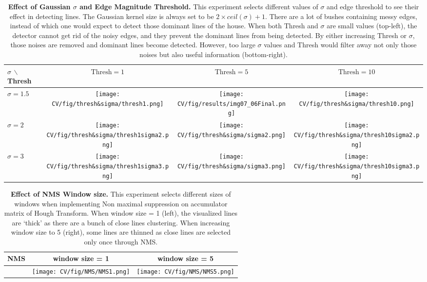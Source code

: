 \documentclass[
  course = {{16-720B Computer Vision}},
  quartile = {{1}},
  assignment = 1-Hough\ Transform,
  name = {{Kangle Deng}},
  email = {{kangled@andrew.cmu.edu}},
  firstexercise = 1
]{aga-homework}
\begin{document}
\begin{table}
  \begin{center}
    \begin{tabular}{lccc}
      \toprule
      \textbf{$\sigma$ $\backslash$ Thresh} & $\text{Thresh} = 1$ & $\text{Thresh} = 5$ & $\text{Thresh} = 10$\\
      \midrule
      $\sigma=1.5$ & \texttt{[image: CV/fig/thresh\&sigma/thresh1.png]} & \texttt{[image: CV/fig/results/img07\_06Final.png]} & \texttt{[image: CV/fig/thresh\&sigma/thresh10.png]}  \\
      $\sigma=2$ &  \texttt{[image: CV/fig/thresh\&sigma/thresh1sigma2.png]} & \texttt{[image: CV/fig/thresh\&sigma/sigma2.png]} & \texttt{[image: CV/fig/thresh\&sigma/thresh10sigma2.png]}  \\
      $\sigma=3$ & \texttt{[image: CV/fig/thresh\&sigma/thresh1sigma3.png]} & \texttt{[image: CV/fig/thresh\&sigma/sigma3.png]} & \texttt{[image: CV/fig/thresh\&sigma/thresh10sigma3.png]}  \\
      \bottomrule
    \end{tabular}
  \end{center}
\caption{\textbf{Effect of Gaussian $\sigma$ and Edge Magnitude Threshold.} This experiment selects different values of $\sigma$ and edge threshold to see their effect in detecting lines. The Gaussian kernel size is always set to be $2\times ceil(\sigma) + 1$. There are a lot of bushes containing messy edges, instead of which one would expect to detect those dominant lines of the house. When both Thresh and $\sigma$ are small values (top-left), the detector cannot get rid of the noisy edges, and they prevent the dominant lines from being detected. By either increasing Thresh or $\sigma$, those noises are removed and dominant lines become detected. However, too large $\sigma$ values and Thresh would filter away not only those noises but also useful information (bottom-right).} 
  \label{tab:thresh_and_sigma}
\end{table}

\begin{table}
  \begin{center}
    \begin{tabular}{lcc}
      \toprule
      \textbf{NMS} & window size = 1 & window size = 5 \\
      \midrule
& \texttt{[image: CV/fig/NMS/NMS1.png]} & \texttt{[image: CV/fig/NMS/NMS5.png]}  \\
    \end{tabular}
  \end{center}
\caption{\textbf{Effect of NMS Window size.} This experiment selects different sizes of windows when implementing Non maximal suppression on accumulator matrix of Hough Transform. When window size = 1 (left), the visualized lines are `thick' as there are a bunch of close lines clustering. When increasing window size to 5 (right), some lines are thinned as close lines are selected only once through NMS.} 
  \label{tab:NMS}
\end{table}
\end{document}
